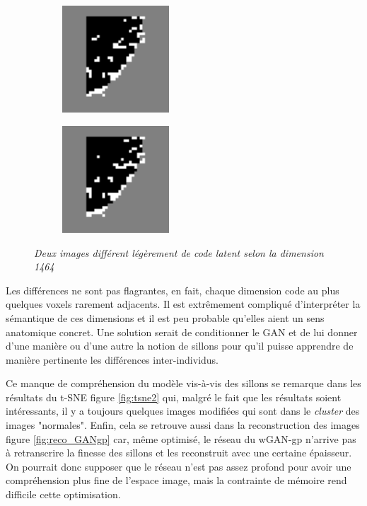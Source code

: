 \documentclass[12pt, oneside, a4paper, titlepage]{article}
\begin{document}
\begin{figure}
\centering
\begin{subfigure}{.2\textwidth}
    \includegraphics[width=4cm,height=4cm]{fake_img9.png}
  \label{fig:sub1}
\end{subfigure}%
\begin{subfigure}{.2\textwidth}
\includegraphics[width=4cm, height=4cm]{fake_img10.png}
  \label{fig:sub2}
\end{subfigure}
\caption{\textit{Deux images différent légèrement de code latent selon la dimension 1464}}
\label{fig:expl3}
\end{figure}

Les différences ne sont pas flagrantes, en fait, chaque dimension code au plus quelques voxels rarement adjacents. Il est extrêmement compliqué d'interpréter la sémantique de ces dimensions et il est peu probable qu'elles aient un sens anatomique concret. Une solution serait de conditionner le GAN et de lui donner d'une manière ou d'une autre la notion de sillons pour qu'il puisse apprendre de manière pertinente les différences inter-individus.

Ce manque de compréhension du modèle vis-à-vis des sillons se remarque dans les résultats du t-SNE figure \ref{fig:tsne2} qui, malgré le fait que les résultats soient intéressants, il y a toujours quelques images modifiées qui sont dans le \textit{cluster }  des images "normales". 
Enfin, cela se retrouve aussi dans la reconstruction des images figure \ref{fig:reco_GANgp} car, même optimisé, le réseau du wGAN-gp n'arrive pas à retranscrire la finesse des sillons et les reconstruit avec une certaine épaisseur. On pourrait donc supposer que le réseau n'est pas assez profond pour avoir une compréhension plus fine de l'espace image, mais la contrainte de mémoire rend difficile cette optimisation.
\end{document}
